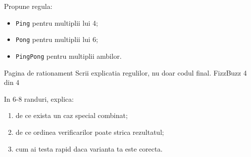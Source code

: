 \begin{solobox}
Propune regula:
\begin{itemize}
\item \texttt{Ping} pentru multiplii lui 4;
\item \texttt{Pong} pentru multiplii lui 6;
\item \texttt{PingPong} pentru multiplii ambilor.
\end{itemize}
\end{solobox}

\clearpage

\PageHeader
  {Pagina de rationament}
  {Scrii explicatia regulilor, nu doar codul final.}
  {FizzBuzz 4 din 4}

\begin{solobox}
In 6-8 randuri, explica:
\begin{enumerate}
\item de ce exista un caz special combinat;
\item de ce ordinea verificarilor poate strica rezultatul;
\item cum ai testa rapid daca varianta ta este corecta.
\end{enumerate}
\end{solobox}

\clearpage

